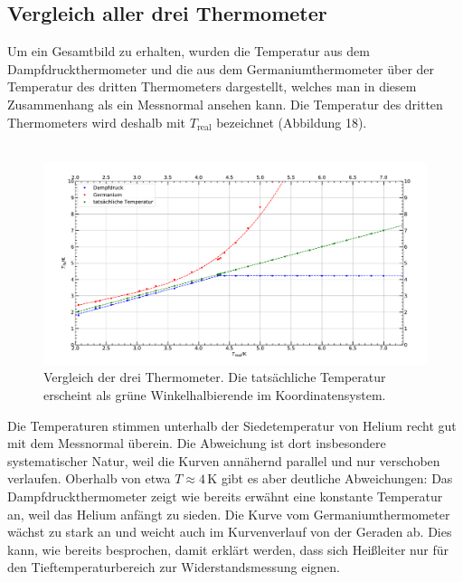 \documentclass[german,  %
parskip=full,  %
]{scrartcl}
\begin{document}
\subsection{Vergleich aller drei Thermometer}
Um ein Gesamtbild zu erhalten, wurden die Temperatur aus dem Dampfdruckthermometer und die aus dem Germaniumthermometer über der Temperatur des dritten Thermometers dargestellt, welches man in diesem Zusammenhang als ein Messnormal ansehen kann. Die Temperatur des dritten Thermometers wird deshalb mit \(T_{\mathrm{real}}\) bezeichnet (Abbildung 18). \\\\
\begin{figure}[h!]\centering
\includegraphics[width=\textwidth]{Thermometervergleich.pdf}
\caption{Vergleich der drei Thermometer. Die tatsächliche Temperatur erscheint als grüne Winkelhalbierende im Koordinatensystem.}
\end{figure}


Die Temperaturen stimmen unterhalb der Siedetemperatur von Helium recht gut mit dem Messnormal überein. Die Abweichung ist dort insbesondere systematischer Natur, weil die Kurven annähernd parallel und nur verschoben verlaufen. Oberhalb von etwa \(T\approx 4\,\mathrm{K}\) gibt es aber deutliche Abweichungen: Das Dampfdruckthermometer zeigt wie bereits erwähnt eine konstante Temperatur an, weil das Helium anfängt zu sieden. Die Kurve vom Germaniumthermometer wächst zu stark an und weicht auch im Kurvenverlauf von der Geraden ab. Dies kann, wie bereits besprochen, damit erklärt werden, dass sich Heißleiter nur für den Tieftemperaturbereich zur Widerstandsmessung eignen. 
\end{document}

